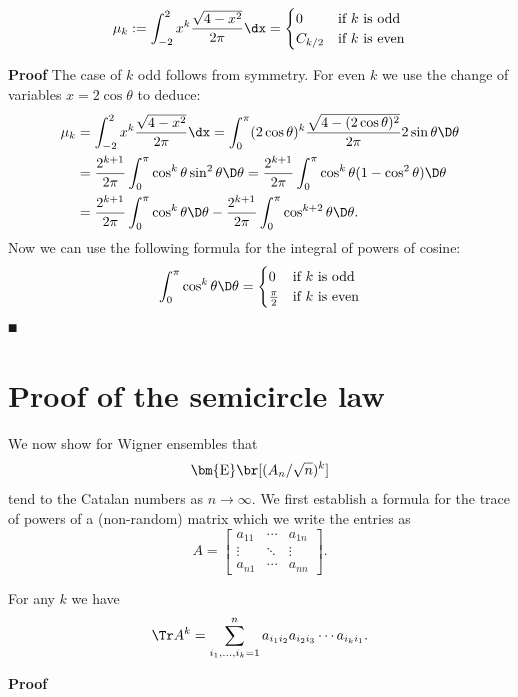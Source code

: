 \begin{lemma}
\[
\ensuremath{\mu}_k := \ensuremath{\int}_{-2}^2 x^k {\sqrt{4-x^2} \over 2\ensuremath{\pi}} \dx = \begin{cases}
0 & \hbox{\textrm{if  $k$ is odd}} \\
C_{k/2} & \hbox{\textrm{if $k$ is even}}
\end{cases}
\]
\end{lemma}
\textbf{Proof} The case of $k$ odd follows from symmetry. For even $k$ we use the change of variables $x = 2 \cos \ensuremath{\theta}$ to deduce:
\begin{align*}
\ensuremath{\mu}_k &= \ensuremath{\int}_{-2}^2 x^k {\sqrt{4-x^2} \over 2\ensuremath{\pi}} \dx = \ensuremath{\int}_0^\ensuremath{\pi} (2 \cos \ensuremath{\theta})^k {\sqrt{4-(2 \cos \ensuremath{\theta})^2} \over 2\ensuremath{\pi}} 2 \sin \ensuremath{\theta} \D\ensuremath{\theta} \\
&= {2^{k+1} \over 2\ensuremath{\pi}} \ensuremath{\int}_0^\ensuremath{\pi} \cos^k \ensuremath{\theta} \sin^2 \ensuremath{\theta} \D\ensuremath{\theta} = {2^{k+1} \over 2\ensuremath{\pi}} \ensuremath{\int}_0^\ensuremath{\pi} \cos^k \ensuremath{\theta} (1-\cos^2 \ensuremath{\theta}) \D\ensuremath{\theta} \\
&= {2^{k+1} \over 2\ensuremath{\pi}} \ensuremath{\int}_0^\ensuremath{\pi} \cos^k \ensuremath{\theta} \D\ensuremath{\theta} - {2^{k+1} \over 2\ensuremath{\pi}} \ensuremath{\int}_0^\ensuremath{\pi} \cos^{k+2} \ensuremath{\theta} \D\ensuremath{\theta}.
\end{align*}
Now we can use the following formula for the integral of powers of cosine:
\[
\ensuremath{\int}_0^\ensuremath{\pi} \cos^k \ensuremath{\theta} \D\ensuremath{\theta} = \begin{cases}
0 & \hbox{\textrm{if  $k$ is odd}} \\
{\ensuremath{\pi} \over 2} & \hbox{\textrm{if $k$ is even}}
\end{cases}
\]
\ensuremath{\QED}

\section{Proof of the semicircle law}
We now show for Wigner ensembles that
\[
\ensuremath{\bm{\mathrm{E}}}\br[(A_n/\sqrt{n})^k]
\]
tend to the Catalan numbers as $n \ensuremath{\rightarrow} \ensuremath{\infty}$. We first establish a formula for the trace of powers of a (non-random) matrix which we write the entries as
\[
A = \begin{bmatrix} a_{11} & \ensuremath{\cdots} & a_{1n} \\ \ensuremath{\vdots} & \ensuremath{\ddots} & \ensuremath{\vdots} \\ a_{n1} & \ensuremath{\cdots} & a_{nn} 
\end{bmatrix}.
\]
\begin{proposition} For any $k$ we have
\[
\Tr A^k = \ensuremath{\sum}_{i_1,\ensuremath{\ldots},i_k = 1}^n a_{i_1 i_2} a_{i_2 i_3} \ensuremath{\cdots} a_{i_k i_1}.
\]
\end{proposition}
\textbf{Proof}

